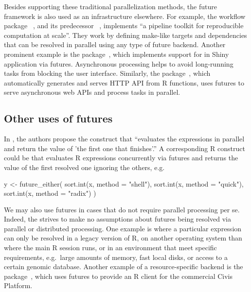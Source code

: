 Besides supporting these traditional parallelization methods, the
future framework is also used as an infrastructure elsewhere.  For
example, the workflow package ~\citep{Landau_2021},
and its predecessor ~\citep{Landau_2018}, implements
``a pipeline toolkit for reproducible computation at scale''.  They
work by defining make-like targets and dependencies that can be
resolved in parallel using any type of future backend.  Another
prominent example is the  package~\citep{CRAN:shiny},
which implements support for  in Shiny
application via futures.  Asynchronous processing helps to avoid
long-running tasks from blocking the user interface.  Similarly,
the  package~\citep{CRAN:plumber}, which
automatically generates and serves HTTP API from R functions, uses
futures to serve asynchronous web APIs and process tasks in parallel.


\vspace{-1ex} %
\subsection{Other uses of futures}
\label{other-usages}

In \citet{HewittBaker_1977}, the authors propose the
 construct that ``evaluates the expressions in
parallel and return the value of 'the first one that finishes'.''  A
corresponding R construct could be  that
evaluates R expressions concurrently via futures and returns the value
of the first resolved one ignoring the others, e.g.
\begin{example}
y <- future_either(
  sort.int(x, method = "shell"),
  sort.int(x, method = "quick"),
  sort.int(x, method = "radix")
)
\end{example}

We may also use futures in cases that do not require parallel
processing per se.  Indeed, the  strives to make no
assumptions about futures being resolved via parallel or distributed
processing.  One example is where a particular expression can only be
resolved in a legacy version of R, on another operating system than
where the main R session runs, or in an environment that meet specific
requirements, e.g.\ large amounts of memory, fast local disks, or
access to a certain genomic database.  Another example of a
resource-specific backend is the 
package~\citep{CRAN:civis}, which uses futures to provide an R client
for the commercial Civis Platform.

